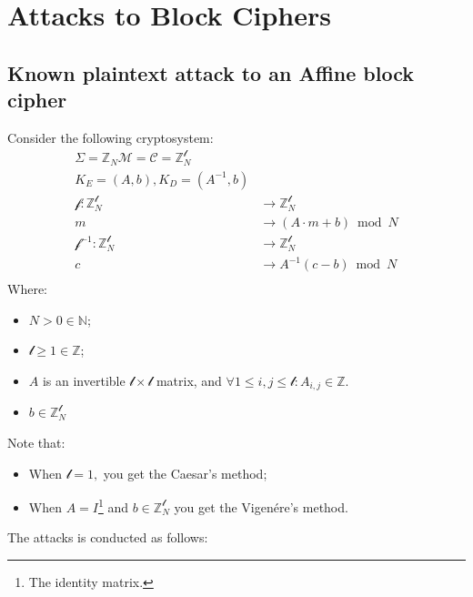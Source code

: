 \section{Attacks to Block Ciphers}
\subsection{Known plaintext attack to an Affine block cipher}
Consider the following cryptosystem:
\begin{align*}
    \Sigma = \mathbb{Z}_{N}
    \mathcal{M} = \mathcal{C} = \mathbb{Z}_{N}^{\mathcal{l}} \\
    K_{E} = (A, b), K_{D} = (A^{-1}, b)\\
    \mathcal{f}: \mathbb{Z}_{N}^{\mathcal{l}} &\rightarrow \mathbb{Z}_{N}^{\mathcal{l}} \\
    m &\rightarrow (A \cdot m + b) \bmod N \\
    \mathcal{f}^{-1}: \mathbb{Z}_{N}^{\mathcal{l}} &\rightarrow \mathbb{Z}_{N}^{\mathcal{l}} \\
    c &\rightarrow A^{-1}(c - b) \bmod N \\
\end{align*}
Where:
\begin{itemize}
    \item $N > 0 \in \mathbb{N}$;
    \item $\mathcal{l} \geq 1 \in \mathbb{Z} $;
    \item $A$ is an invertible $\mathcal{l} \times \mathcal{l}$ matrix, and $\forall 1 \leq i,j \leq \mathcal{l}: A_{i,j} \in \mathbb{Z}$.
    \item $b \in \mathbb{Z}_{N}^{\mathcal{l}}$
\end{itemize}
Note that:
\begin{itemize}
    \item When $\mathcal{l} = 1, $ you get the Caesar's method;
    \item When $A = I$\footnote{The identity matrix.} and $b \in \mathbb{Z}_{N}^{\mathcal{l}}$ you get the Vigenére's method.
\end{itemize}
The attacks is conducted as follows:
